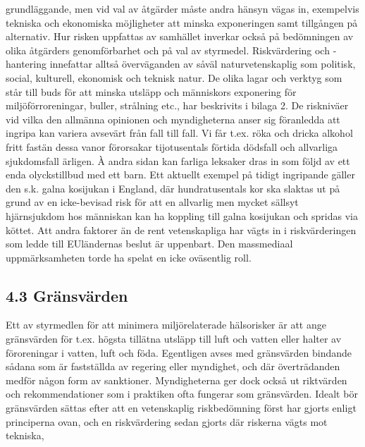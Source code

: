 grundläggande, men vid val av åtgärder måste andra hänsyn vägas in, exempelvis tekniska och ekonomiska möjligheter att minska exponeringen samt tillgången på alternativ. Hur risken uppfattas av samhället inverkar också på bedömningen av olika åtgärders genomförbarhet och på val av styrmedel. Riskvärdering och -hantering innefattar alltså överväganden av såväl naturvetenskaplig som politisk, social, kulturell, ekonomisk och teknisk natur.
De olika lagar och verktyg som står till buds för att minska utsläpp och människors exponering för miljöförroreningar, buller, strålning etc., har beskrivits i bilaga 2.
De riskniväer vid vilka den allmänna opinionen och myndigheterna anser sig föranledda att ingripa kan variera avsevärt från fall till fall. Vi får t.ex. röka och dricka alkohol fritt fastän dessa vanor förorsakar tijotusentals förtida dödsfall och allvarliga sjukdomsfall ärligen. À andra sidan kan farliga leksaker dras in som följd av ett enda olyckstillbud med ett barn. Ett aktuellt exempel på tidigt ingripande gäller den s.k. galna kosijukan i England, där hundratusentals kor ska slaktas ut på grund av en icke-bevisad risk för att en allvarlig men mycket sällsyt hjärnsjukdom hos människan kan ha koppling till galna kosijukan och spridas via köttet. Att andra faktorer än de rent vetenskapliga har vägts in i riskvärderingen som ledde till EUländernas beslut är uppenbart. Den massmediaal uppmärksamheten torde ha spelat en icke oväsentlig roll.
\subsection*{4.3 Gränsvärden}
Ett av styrmedlen för att minimera miljörelaterade hälsorisker är att ange gränsvärden för t.ex. högsta tillätna utsläpp till luft och vatten eller halter av föroreningar i vatten, luft och föda. Egentligen avses med gränsvärden bindande sådana som är fastställda av regering eller myndighet, och där överträdanden medför någon form av sanktioner. Myndigheterna ger dock också ut riktvärden och rekommendationer som i praktiken ofta fungerar som gränsvärden.
Idealt bör gränsvärden sättas efter att en vetenskaplig riskbedömning först har gjorts enligt principerna ovan, och en riskvärdering sedan gjorts där riskerna vägts mot tekniska,

